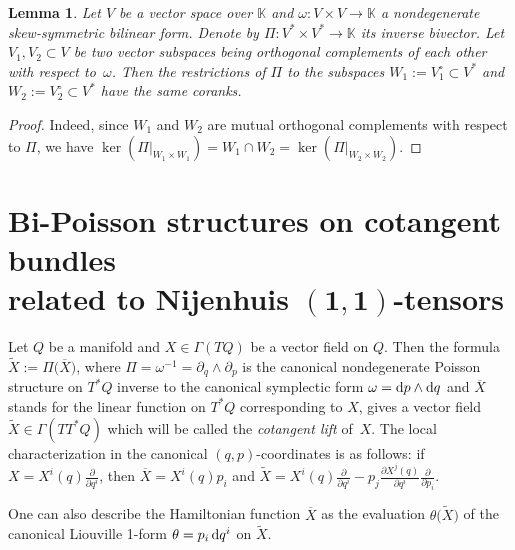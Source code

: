 \documentclass[10pt,a4paper]{amsart}
\numberwithin{equation}{section}
\newtheorem{Lemma}[Theorem]{Lemma}
\begin{document}
\begin{Lemma}\label{lemM}Let $V$ be a vector space over $\mathbb{K}$ and $\omega\colon V\times V\to \mathbb{K}$ a nondegenerate skew-symmetric bilinear form. Denote by $\Pi\colon V^*\times V^*\to\mathbb{K}$ its inverse bivector. Let $V_1,V_2 \subset V$ be two vector subspaces being orthogonal complements of each other with respect to~$\omega$. Then the restrictions of $\Pi$ to the subspaces $W_1:=V_1^\circ \subset V^*$ and $W_2:=V_2^\circ \subset V^*$ have the same coranks.
\end{Lemma}

\begin{proof} Indeed, since $W_1$ and $W_2$ are mutual orthogonal complements with respect to $\Pi$, we have $\ker(\Pi|_{W_1\times W_1})=W_1\cap W_2=\ker(\Pi|_{W_2\times W_2})$.
\end{proof}

\section[Bi-Poisson structures on cotangent bundles related to Nijenhuis $(1,1)$-tensors]{Bi-Poisson structures on cotangent bundles\\ related to Nijenhuis $\boldsymbol{(1,1)}$-tensors}\label{sec:Bi-Poisson}

\begin{Definition}\label{defi2}Let $Q$ be a manifold and $X\in \Gamma(TQ)$ be a vector field on $Q$. Then the formula $\widetilde X:=\Pi\big(\overline X\big)$, where $\Pi=\omega^{-1}=\partial_q\wedge\partial_p$ is the canonical nondegenerate Poisson structure on $T^*Q$ inverse to the canonical symplectic form $\omega={\rm d}p\wedge {\rm d}q$ and $\overline X$ stands for the linear function on $T^*Q$ corresponding to $X$, gives a vector field $\widetilde X\in\Gamma(TT^*Q)$ which will be called the {\em cotangent lift} of~$X$. The local characterization in the canonical $(q,p)$-coordinates is as follows: if $X=X^i(q)\frac{\partial }{\partial q^i}$, then $\overline{X}=X^i(q)p_i$ and $\widetilde X=X^i(q)\frac{\partial }{\partial q^i}-p_j\frac{\partial X^j(q)}{\partial q^i}\frac{\partial }{\partial p_i}$.
\end{Definition}

\begin{Remark}\label{reem} One can also describe the Hamiltonian function $\overline{X}$ as the evaluation $\theta\big(\widetilde{X}\big)$ of the canonical Liouville 1-form $\theta=p_i\,{\rm d}q^i$ on $\widetilde{X}$.
\end{Remark}
\end{document}
